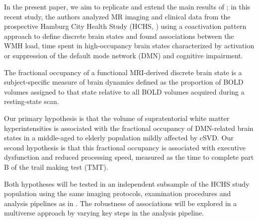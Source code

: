 In the present paper, we aim to replicate and extend the main results of \citep{Schlemm2022-he};
in this recent study, the authors analyzed MR imaging and clinical data from the prospective Hamburg City Health Study (HCHS, \citep{Jagodzinski2020-lx}) using a coactivation pattern approach to define discrete brain states and found associations between the WMH load, time spent in high-occupancy brain states characterized by activation or suppression of the default mode network (DMN) and cognitive impairment.

The fractional occupancy of a functional MRI-derived discrete brain state is a subject-specific measure of brain dynamics defined as the proportion of BOLD volumes assigned to that state relative to all BOLD volumes acquired during a resting-state scan.

Our primary hypothesis is that the volume of supratentorial white matter hyperintensities is associated with the fractional occupancy of DMN-related brain states in a middle-aged to elderly population mildly affected by cSVD.
Our second hypothesis is that this fractional occupancy is associated with executive dysfunction and reduced processing speed, measured as the time to complete part B of the trail making test (TMT).

Both hypotheses will be tested in an independent subsample of the HCHS study population using the same imaging protocols, examination procedures and analysis pipelines as in \citep{Schlemm2022-he}.
The robustness of associations will be explored in a multiverse approach by varying key steps in the analysis pipeline.

